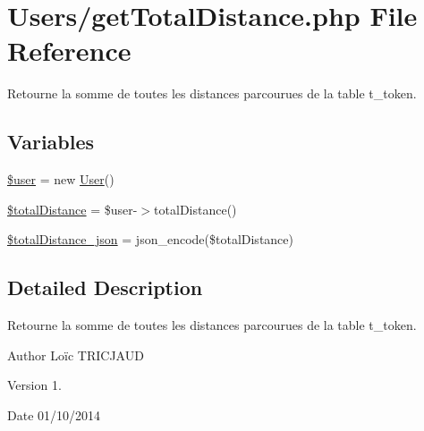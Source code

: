 \hypertarget{get_total_distance_8php}{\section{Users/get\-Total\-Distance.php File Reference}
\label{get_total_distance_8php}
}


Retourne la somme de toutes les distances parcourues de la table t\-\_\-token.  


\subsection*{Variables}
\begin{DoxyCompactItemize}
\item 
\hyperlink{get_total_distance_8php_a598ca4e71b15a1313ec95f0df1027ca5}{\$user} = new \hyperlink{class_user}{User}()
\item 
\hyperlink{get_total_distance_8php_aecf4f5c7feb86dbfd706f9eac2f9741a}{\$total\-Distance} = \$user-\/$>$total\-Distance()
\item 
\hyperlink{get_total_distance_8php_a46125fa56c2833db854f0eadad2a5d2f}{\$total\-Distance\-\_\-json} = json\-\_\-encode(\$total\-Distance)
\end{DoxyCompactItemize}


\subsection{Detailed Description}
Retourne la somme de toutes les distances parcourues de la table t\-\_\-token. \begin{DoxyAuthor}{Author}
Loïc T\-R\-I\-C\-J\-A\-U\-D 
\end{DoxyAuthor}
\begin{DoxyVersion}{Version}
1. 
\end{DoxyVersion}
\begin{DoxyDate}{Date}
01/10/2014 
\end{DoxyDate}


